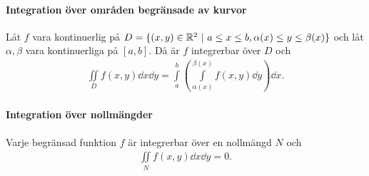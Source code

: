 \proof

\paragraph{Integration över områden begränsade av kurvor}
Låt $f$ vara kontinuerlig på $D = \{(x, y)\in\R^2\ |\ a\leq x\leq b, \alpha(x)\leq y\leq\beta(x)\}$ och låt $\alpha, \beta$ vara kontinuerliga på $[a, b]$. Då är $f$ integrerbar över $D$ och
\begin{align*}
	\iint\limits_{D}f(x, y)\dd{x}\dd{y} = \int\limits_{a}^{b}\left(\int\limits_{\alpha(x)}^{\beta(x)}f(x, y)\dd{y}\right)\dd{x}.
\end{align*}

\proof

\paragraph{Integration över nollmängder}
Varje begränsad funktion $f$ är integrerbar över en nollmängd $N$ och
\begin{align*}
	\iint\limits_{N}f(x, y)\dd{x}\dd{y} = 0.
\end{align*}

